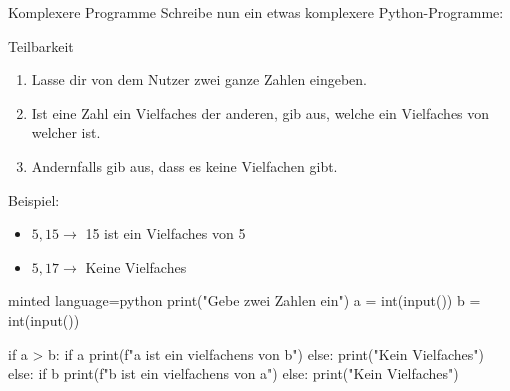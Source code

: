 \begin{task}{Komplexere Programme}
    Schreibe nun ein etwas komplexere Python-Programme:

    \begin{subtask*}{Teilbarkeit}
        \begin{enumerate}
            \item Lasse dir von dem Nutzer zwei ganze Zahlen eingeben.
            \item Ist eine Zahl ein Vielfaches der anderen, gib aus,
                welche ein Vielfaches von welcher ist.
            \item Andernfalls gib aus, dass es keine Vielfachen gibt.
        \end{enumerate}

        Beispiel:
        \begin{itemize}
            \item $5, 15 \to$ 15 ist ein Vielfaches von 5
            \item $5, 17 \to$ Keine Vielfaches
        \end{itemize}

        \begin{hinweise}
        \end{hinweise}

        \begin{solution}
            \begin{codeBlock}[]{minted language=python}
                print("Gebe zwei Zahlen ein")
                a = int(input())
                b = int(input())

                if a > b:
                    if a %
                        print(f"{a} ist ein vielfachens von {b}")
                    else:
                        print("Kein Vielfaches")
                else:
                    if b %
                        print(f"{b} ist ein vielfachens von {a}")
                    else:
                        print("Kein Vielfaches")
            \end{codeBlock}
        \end{solution}
    \end{subtask*}


\end{task}
